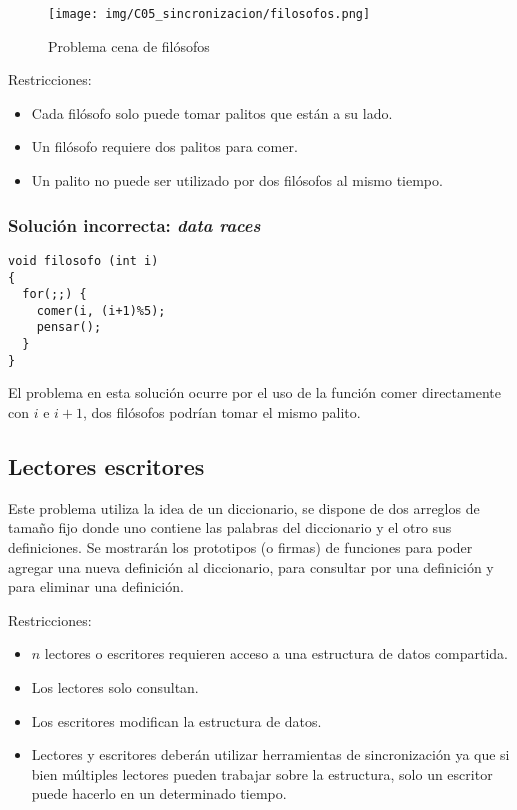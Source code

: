 \begin{figure}[htbp]
\centering
\texttt{[image: img/C05\_sincronizacion/filosofos.png]}
\caption{Problema cena de filósofos}
\label{fig:concurrencia_filosofos}
\end{figure}

Restricciones:
\begin{itemize}
\item Cada filósofo solo puede tomar palitos que están a su lado.
\item Un filósofo requiere dos palitos para comer.
\item Un palito no puede ser utilizado por dos filósofos al mismo tiempo.
\end{itemize}

\subsubsection{Solución incorrecta: \emph{data races}}
\begin{lstlisting}
void filosofo (int i)
{
  for(;;) {
    comer(i, (i+1)%5);
    pensar();
  }
}
\end{lstlisting}

El problema en esta solución ocurre por el uso de la función comer
directamente con $i$ e $i+1$, dos filósofos podrían tomar el mismo palito.

\subsection{Lectores escritores}
Este problema utiliza la idea de un diccionario, se dispone de dos arreglos de
tamaño fijo donde uno contiene las palabras del diccionario y el otro sus
definiciones. Se mostrarán los prototipos (o firmas) de funciones para poder
agregar una nueva definición al diccionario, para consultar por una definición y
para eliminar una definición.

Restricciones:
\begin{itemize}
\item $n$ lectores o escritores requieren acceso a una estructura de datos
compartida.
\item Los lectores solo consultan.
\item Los escritores modifican la estructura de datos.
\item Lectores y escritores deberán utilizar herramientas de sincronización ya
que si bien múltiples lectores pueden trabajar sobre la estructura, solo un
escritor puede hacerlo en un determinado tiempo.
\end{itemize}

